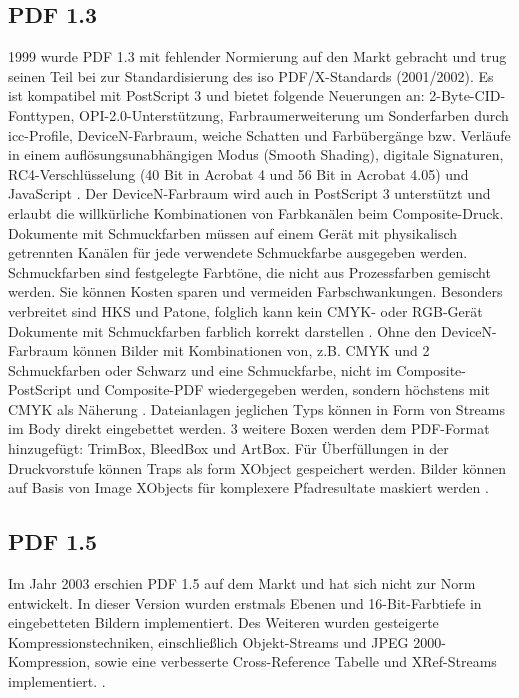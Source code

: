 \subsection{PDF 1.3}
1999 wurde PDF 1.3 mit fehlender Normierung auf den Markt gebracht und trug seinen Teil bei zur Standardisierung des \gls{iso} PDF/X-Standards (2001/2002). Es ist kompatibel mit PostScript 3 und bietet folgende Neuerungen an: 2-Byte-CID-Fonttypen, OPI-2.0-Unterstützung, Farbraumerweiterung um Sonderfarben durch \gls{icc}-Profile, DeviceN-Farbraum, weiche Schatten und Farbübergänge bzw. Verläufe in einem auflösungsunabhängigen Modus (Smooth Shading), digitale Signaturen, RC4-Verschlüsselung (40 Bit in Acrobat 4 und 56 Bit in Acrobat 4.05) und JavaScript \cite{proj-consult, schneeberger}. Der DeviceN-Farbraum wird auch in PostScript 3 unterstützt und erlaubt die willkürliche Kombinationen von Farbkanälen beim Composite-Druck. Dokumente mit Schmuckfarben müssen auf einem Gerät mit physikalisch getrennten Kanälen für jede verwendete Schmuckfarbe ausgegeben werden. Schmuckfarben sind festgelegte Farbtöne, die nicht aus Prozessfarben gemischt werden. Sie können Kosten sparen und vermeiden Farbschwankungen. Besonders verbreitet sind HKS und Patone, folglich kann kein CMYK- oder RGB-Gerät Dokumente mit Schmuckfarben farblich korrekt darstellen \cite{kompendium}. Ohne den DeviceN-Farbraum können Bilder mit Kombinationen von, z.B. CMYK und 2 Schmuckfarben oder Schwarz und eine Schmuckfarbe, nicht im Composite-PostScript und Composite-PDF wiedergegeben werden, sondern höchstens mit CMYK als Näherung \cite{helios}. Dateianlagen jeglichen Typs können in Form von Streams im Body direkt eingebettet werden. 3 weitere Boxen werden dem PDF-Format hinzugefügt: TrimBox, BleedBox und ArtBox. Für Überfüllungen in der Druckvorstufe können Traps als form XObject gespeichert werden. Bilder können auf Basis von Image XObjects für komplexere Pfadresultate maskiert werden \cite{schneeberger}.

\subsection{PDF 1.5}
Im Jahr 2003 erschien PDF 1.5 auf dem Markt und hat sich nicht zur Norm entwickelt. In dieser Version wurden erstmals Ebenen und 16-Bit-Farbtiefe in eingebetteten Bildern implementiert. Des Weiteren wurden gesteigerte Kompressionstechniken, einschließlich Objekt-Streams und JPEG 2000-Kompression, sowie eine verbesserte Cross-Reference Tabelle und XRef-Streams implementiert. \cite{proj-consult, schneeberger}. 

